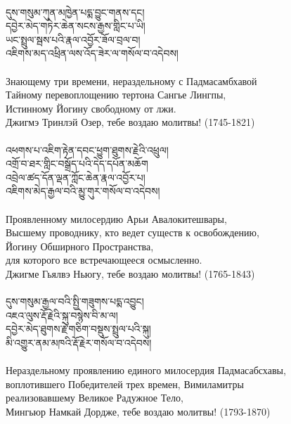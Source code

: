 \\
{\ti
དུས་གསུམ་ཀུན་མཁྱེན་པདྨ་བྱུང་གནས་དང། \\
དབྱེར་མེད་གཏེར་ཆེན་སངས་རྒྱས་གླིང་པ་ཡི།\\
ཡང་སྤྲུལ་སྦས་པའི་རྣལ་འབྱོར་ཟོལ་བྲལ་བ།\\
འཇིགས་མད་འཕྲིན་ལས་འོད་ཟེར་ལ་གསོལ་བ་འདེབས།}\\
\\
\ru
Знающему три времени, нераздельному с Падмасамбхавой\\
Тайному перевоплощению тертона Сангье Лингпы,\\
Истинному Йогину свободному от лжи.\\
Джигмэ Тринлэй Озер, тебе воздаю молитвы! (1745-1821)\\
\\
{\ti
འཕགས་པ་འཇིག་རྟེན་དབང་ཕྱུག་ཐུགས་རྗེའི་འཕྲུལ། \\
འགྲོ་བ་ཐར་གླིང་བསྒྲོད་པའི་དེད་དཔོན་མཆོག \\
འབྲེལ་ཚད་དོན་ལྡན་ཀློང་ཆེན་རྣལ་འབྱོར་པ། \\
འཇིགས་མེད་རྒྱལ་བའི་མྱུ་གུར་གསོལ་བ་འདེབས།}\\
\\
\ru
Проявленному милосердию Арьи Авалокитешвары,\\
Высшему проводнику, кто ведет существ к освобождению,\\
Йогину Обширного Пространства,\\
для которого все встречающееся осмысленно.\\
Джигме Гьялвэ Ньюгу, тебе воздаю молитвы! (1765-1843)\\
\\


\newpage
{\ti
དུས་གསུམ་རྒྱལ་བའི་སྤྱི་གཟུགས་པདྨ་འབྱུང། \\
འཇའ་ལུས་རྡོ་རྗེའི་སྐུ་བསྙེས་བི་མ་ལ། \\
དབྱེར་མེད་ཐུགས་རྗེ་གཅིག་བསྡུས་སྤྲུལ་པའི་སྐུ། \\
མི་འགྱུར་ནམ་མཁའི་རྡོ་རྗེར་གསོལ་བ་འདེབས།}\\
\\
\ru
Нераздельному проявлению единого милосердия Падмасабсхавы,\\
воплотившего Победителей трех времен, Вимиламитры\\
реализовавшему Великое Радужное Тело,\\
Мингьюр Намкай Дордже, тебе воздаю молитвы! (1793-1870)\\
\\

